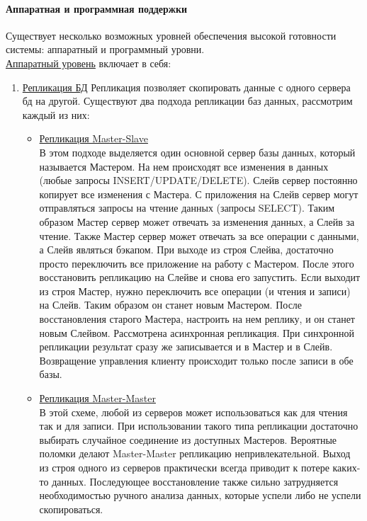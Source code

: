 \paragraph{Аппаратная и программная поддержки}
Существует несколько возможных уровней обеспечения высокой готовности системы: аппаратный и программный уровни. \\
\underline{Аппаратный уровень} включает в себя:
\begin{enumerate}
    \item \underline{Репликация БД}
    Репликация позволяет скопировать данные с одного сервера бд на другой.
    Существуют  два подхода репликации баз данных, рассмотрим каждый из них:
    \begin{itemize}
        \item \underline{Репликация Master-Slave} \\В этом подходе выделяется один основной сервер базы данных, который называется Мастером. На нем происходят все изменения в данных (любые запросы INSERT/UPDATE/DELETE). Слейв сервер постоянно копирует все изменения с Мастера. С приложения на Слейв сервер могут отправляться запросы на чтение данных (запросы SELECT). Таким образом Мастер сервер может отвечать за изменения данных, а Слейв за чтение. Также Мастер сервер может отвечать за все операции с данными, а Слейв являться бэкапом. При выходе из строя Слейва, достаточно просто переключить все приложение на работу с Мастером. После этого восстановить репликацию на Слейве и снова его запустить. Если выходит из строя Мастер, нужно переключить все операции (и чтения и записи) на Слейв. Таким образом он станет новым Мастером. После восстановления старого Мастера, настроить на нем реплику, и он станет новым Слейвом. Рассмотрена асинхронная репликация. При синхронной репликации результат сразу же записывается и в Мастер и в Слейв. Возвращение управления клиенту происходит только после записи в обе базы.
        \item \underline{Репликация Master-Master}\\ В этой схеме, любой из серверов может использоваться как для чтения так и для записи. При использовании такого типа репликации достаточно выбирать случайное соединение из доступных Мастеров. Вероятные поломки делают Master-Master репликацию непривлекательной. Выход из строя одного из серверов практически всегда приводит к потере каких-то данных. Последующее восстановление также сильно затрудняется необходимостью ручного анализа данных, которые успели либо не успели скопироваться.
    \end{itemize}


\end{enumerate}
